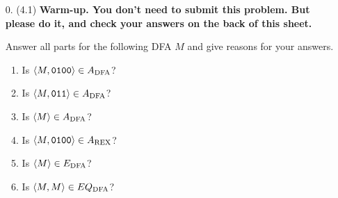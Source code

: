 \documentclass[11pt]{article}
\begin{document}
\begin{enumerate}
\if{}

\item[0.] (4.1)  {\bf Warm-up. You don't need to submit this problem. But please do it, and check your answers on the back of this sheet.} 

Answer all parts for the following DFA $M$ and give reasons for your answers.

\begin{minipage}{.5\linewidth}
\begin{enumerate}
\item Is $\langle M, {\tt 0100} \rangle \in A_\textnormal{DFA}$?
\item Is $\langle M, {\tt 011} \rangle \in A_\textnormal{DFA}$?
\item Is $\langle M \rangle \in A_\textnormal{DFA}$?
\item Is $\langle M, {\tt 0100} \rangle \in A_\textnormal{REX}$?
\item Is $\langle M \rangle \in E_\textnormal{DFA}$?
\item Is $\langle M,M \rangle \in EQ_\textnormal{DFA}$?
\end{enumerate}
\end{minipage}
\begin{minipage}{.5\linewidth}
\end{minipage}
\fi


\end{enumerate}
\end{document}

